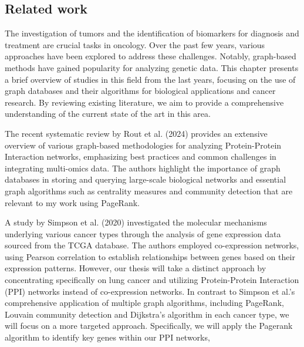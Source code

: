\subsection{Related work} \label{subsec:related_work}
The investigation of tumors and the identification of biomarkers for diagnosis and treatment are crucial tasks in oncology.
Over the past few years, various approaches have been explored to address these challenges.
Notably, graph-based methods have gained popularity for analyzing genetic data.
This chapter presents a brief overview of studies in this field from the last years,
focusing on the use of graph databases and their algorithms for biological applications and cancer research.
By reviewing existing literature, we aim to provide a comprehensive understanding of the current state of the art in this area.


The recent systematic review by Rout et al. (2024) \cite{rout2024systematic} provides an extensive overview of
various graph-based methodologies for analyzing Protein-Protein Interaction networks,
emphasizing best practices and common challenges in integrating multi-omics data.
The authors highlight the importance of graph databases in storing and querying large-scale biological networks
and essential graph algorithms such as centrality measures and community detection that are relevant to my work using PageRank.


A study by Simpson et al. (2020) \cite{simpson2020applying} investigated the molecular mechanisms underlying various cancer types
through the analysis of gene expression data sourced from the TCGA database.
The authors employed co-expression networks, using Pearson correlation to establish relationships between genes based on their expression patterns.
However, our thesis will take a distinct approach by concentrating specifically on lung cancer
and utilizing Protein-Protein Interaction (PPI) networks instead of co-expression networks.
In contrast to Simpson et al.'s comprehensive application of multiple graph algorithms, including PageRank,
Louvain community detection and Dijkstra's algorithm in each cancer type, we will focus on a more targeted approach.
Specifically, we will apply the Pagerank algorithm to identify key genes within our PPI networks,


